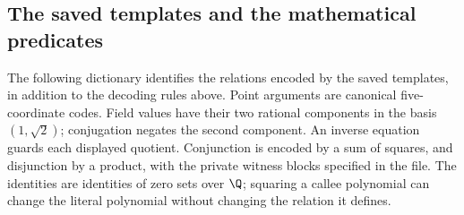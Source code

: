 \subsection{The saved templates and the mathematical predicates}
\label{subsec:v10-template-dictionary}
The following dictionary identifies the relations encoded by the saved
templates, in addition to the decoding rules above. Point arguments are
canonical five-coordinate codes. Field values have their two rational
components in the basis $(1,\sqrt2)$; conjugation negates the second
component. An inverse equation guards each displayed quotient.
Conjunction is encoded by a sum of squares, and disjunction by a
product, with the private witness blocks specified in the file.
The identities are identities of zero sets over $\Q$; squaring a
callee polynomial can change the literal polynomial without changing
the relation it defines.

